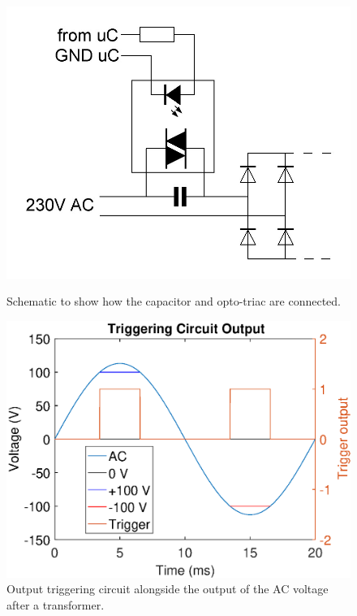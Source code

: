

	\begin{figure}[!tbp]
	  \centering
	  \begin{minipage}[b]{0.49\textwidth}
	    \includegraphics[width=\textwidth]{chapters/hardware-chapters/ac-capacitor-triac.JPG}
		\caption{Schematic to show how the capacitor and opto-triac are connected.}
		\label{fig:ac-capacitor-triac}
	  \end{minipage}
	  \hfill
	  \begin{minipage}[b]{0.49\textwidth}
	    \includegraphics[width=\textwidth]{chapters/hardware-chapters/ac-wave-lower-transformed-triggering.eps}
	    \caption{Output triggering circuit alongside the output of the AC voltage after a transformer.}
	    \label{fig:trigger-output-lower-transformed}
	  \end{minipage}
	\end{figure}



